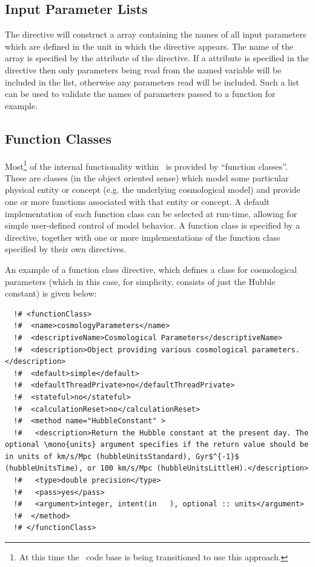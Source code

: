 \subsection{Input Parameter Lists}

The  directive will construct a  array containing the names of all input parameters which are defined in the unit in which the directive appears. The name of the array is specified by the  attribute of the  directive. If a  attribute is specified in the directive then only parameters being read from the named variable will be included in the list, otherwise any parameters read will be included. Such a list can be used to validate the names of parameters passed to a function for example.

\subsection{Function Classes}

Most\footnote{At this time the \protect\glc\ code base is being transitioned to use this approach.} of the internal functionality within \glc\ is provided by ``function classes''. These are classes (in the object oriented sense) which model some particular physical entity or concept (e.g. the underlying cosmological model) and provide one or more functions associated with that entity or concept. A default implementation of each function class can be selected at run-time, allowing for simple user-defined control of model behavior. A function class is specified by a  directive, together with one or more implementations of the function class specified by their own directives.

An example of a function class directive, which defines a class for cosmological parameters (which in this case, for simplicity, consists of just the Hubble constant) is given below:

\begin{lstlisting}
  !# <functionClass>
  !#  <name>cosmologyParameters</name>
  !#  <descriptiveName>Cosmological Parameters</descriptiveName>
  !#  <description>Object providing various cosmological parameters.</description>
  !#  <default>simple</default>
  !#  <defaultThreadPrivate>no</defaultThreadPrivate>
  !#  <stateful>no</stateful>
  !#  <calculationReset>no</calculationReset>
  !#  <method name="HubbleConstant" >
  !#   <description>Return the Hubble constant at the present day. The optional \mono{units} argument specifies if the return value should be in units of km/s/Mpc (hubbleUnitsStandard), Gyr$^{-1}$ (hubbleUnitsTime), or 100 km/s/Mpc (hubbleUnitsLittleH).</description>
  !#   <type>double precision</type>
  !#   <pass>yes</pass>
  !#   <argument>integer, intent(in   ), optional :: units</argument>
  !#  </method>
  !# </functionClass>
\end{lstlisting}

